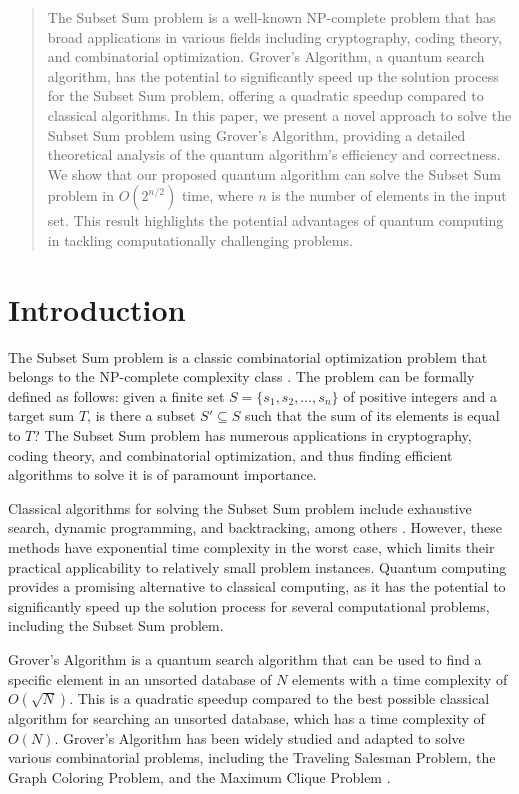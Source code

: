 \begin{abstract}
The Subset Sum problem is a well-known NP-complete problem that has broad applications in various fields including cryptography, coding theory, and combinatorial optimization. Grover's Algorithm, a quantum search algorithm, has the potential to significantly speed up the solution process for the Subset Sum problem, offering a quadratic speedup compared to classical algorithms. In this paper, we present a novel approach to solve the Subset Sum problem using Grover's Algorithm, providing a detailed theoretical analysis of the quantum algorithm's efficiency and correctness. We show that our proposed quantum algorithm can solve the Subset Sum problem in $O\left(2^{n/2}\right)$ time, where $n$ is the number of elements in the input set. This result highlights the potential advantages of quantum computing in tackling computationally challenging problems.

\end{abstract}

\section{Introduction}
The Subset Sum problem is a classic combinatorial optimization problem that belongs to the NP-complete complexity class \cite{GareyJohnson}. The problem can be formally defined as follows: given a finite set $S = \{s_1, s_2, \ldots, s_n\}$ of positive integers and a target sum $T$, is there a subset $S'\subseteq S$ such that the sum of its elements is equal to $T$? The Subset Sum problem has numerous applications in cryptography, coding theory, and combinatorial optimization, and thus finding efficient algorithms to solve it is of paramount importance.

Classical algorithms for solving the Subset Sum problem include exhaustive search, dynamic programming, and backtracking, among others \cite{HorowitzSahni, Bellman, CarraghanPardalos}. However, these methods have exponential time complexity in the worst case, which limits their practical applicability to relatively small problem instances. Quantum computing provides a promising alternative to classical computing, as it has the potential to significantly speed up the solution process for several computational problems, including the Subset Sum problem.

Grover's Algorithm \cite{Grover} is a quantum search algorithm that can be used to find a specific element in an unsorted database of $N$ elements with a time complexity of $O\left(\sqrt{N}\right)$. This is a quadratic speedup compared to the best possible classical algorithm for searching an unsorted database, which has a time complexity of $O(N)$. Grover's Algorithm has been widely studied and adapted to solve various combinatorial problems, including the Traveling Salesman Problem, the Graph Coloring Problem, and the Maximum Clique Problem \cite{DurrHoyer,ShenviKempeWhaley,ChildsKimmelKothari}.


